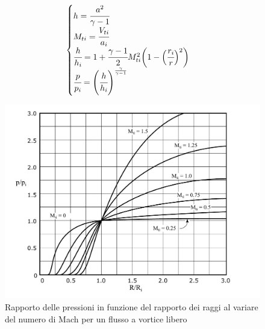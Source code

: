 \begin{align*}
\begin{cases}
h = \cfrac{a ^ 2}{\gamma - 1} \\
M_{ti} = \cfrac{V_{ti}}{a_i}\\
\cfrac{h}{h_i} = 1 + \cfrac{\gamma -1}{2} M_{ti}^2 \bigg(1 -  \Big( \cfrac{r_i}{r}\Big)^2 \bigg)\\
\cfrac{p}{p_i} = \left( \cfrac{h}{h_i} \right)^{\frac{\gamma}{\gamma - 1}}
\end{cases}
\end{align*}
\begin{figure}
\centering
  \includegraphics[width=.75\textwidth]{fig/VorticeLibero.pdf}
\caption{Rapporto delle pressioni in funzione del rapporto dei raggi al variare del numero di Mach per un flusso a vortice libero}
\label{fig:VorticeLibero}
\end{figure}
